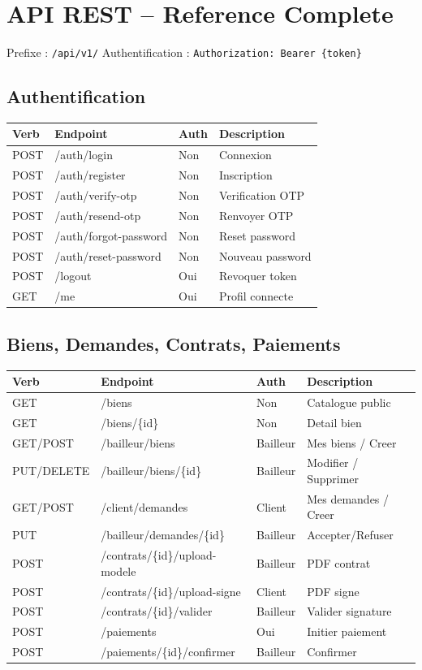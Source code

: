 \documentclass[12pt,a4paper]{article}
\begin{document}
\section{API REST -- Reference Complete}

Prefixe : \texttt{/api/v1/} \quad Authentification : \texttt{Authorization: Bearer \{token\}}

\subsection{Authentification}
\begin{longtable}{|p{1.5cm}|p{5.5cm}|p{2cm}|p{4cm}|}
\hline
\textbf{Verb} & \textbf{Endpoint} & \textbf{Auth} & \textbf{Description} \\
\hline
\endhead
POST & /auth/login & Non & Connexion \\
POST & /auth/register & Non & Inscription \\
POST & /auth/verify-otp & Non & Verification OTP \\
POST & /auth/resend-otp & Non & Renvoyer OTP \\
POST & /auth/forgot-password & Non & Reset password \\
POST & /auth/reset-password & Non & Nouveau password \\
POST & /logout & Oui & Revoquer token \\
GET & /me & Oui & Profil connecte \\
\hline
\end{longtable}

\subsection{Biens, Demandes, Contrats, Paiements}
\begin{longtable}{|p{1.5cm}|p{6cm}|p{2cm}|p{3cm}|}
\hline
\textbf{Verb} & \textbf{Endpoint} & \textbf{Auth} & \textbf{Description} \\
\hline
\endhead
GET & /biens & Non & Catalogue public \\
GET & /biens/\{id\} & Non & Detail bien \\
GET/POST & /bailleur/biens & Bailleur & Mes biens / Creer \\
PUT/DELETE & /bailleur/biens/\{id\} & Bailleur & Modifier / Supprimer \\
GET/POST & /client/demandes & Client & Mes demandes / Creer \\
PUT & /bailleur/demandes/\{id\} & Bailleur & Accepter/Refuser \\
POST & /contrats/\{id\}/upload-modele & Bailleur & PDF contrat \\
POST & /contrats/\{id\}/upload-signe & Client & PDF signe \\
POST & /contrats/\{id\}/valider & Bailleur & Valider signature \\
POST & /paiements & Oui & Initier paiement \\
POST & /paiements/\{id\}/confirmer & Bailleur & Confirmer \\
\hline
\end{longtable}
\end{document}

